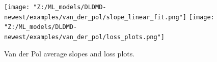 
\begin{figure}[ht]
    \centering
    \begin{minipage}{\textwidth}
        \texttt{[image: "Z:/ML\_models/DLDMD-newest/examples/van\_der\_pol/slope\_linear\_fit.png"]} 
        \texttt{[image: "Z:/ML\_models/DLDMD-newest/examples/van\_der\_pol/loss\_plots.png"]} 
    \end{minipage}
    \caption{Van der Pol average slopes and loss plots.}
\end{figure}

